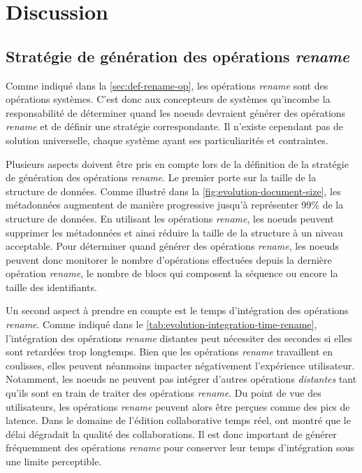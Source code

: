 \documentclass[12pt]{thesul}
\begin{document}
\section{Discussion}


\subsection{Stratégie de génération des opérations \emph{rename}}

Comme indiqué dans la \autoref{sec:def-rename-op}, les opérations \emph{rename} sont des opérations systèmes.
C'est donc aux concepteurs de systèmes qu'incombe la responsabilité de déterminer quand les noeuds devraient générer des opérations \emph{rename} et de définir une stratégie correspondante.
Il n'existe cependant pas de solution universelle, chaque système ayant ses particuliarités et contraintes.

Plusieurs aspects doivent être pris en compte lors de la définition de la stratégie de génération des opérations \emph{rename}.
Le premier porte sur la taille de la structure de données.
Comme illustré dans la \autoref{fig:evolution-document-size}, les métadonnées augmentent de manière progressive jusqu'à représenter 99\% de la structure de données.
En utilisant les opérations \emph{rename}, les noeuds peuvent supprimer les métadonnées et ainsi réduire la taille de la structure à un niveau acceptable.
Pour déterminer quand générer des opérations \emph{rename}, les noeuds peuvent donc monitorer le nombre d'opérations effectuées depuis la dernière opération \emph{rename}, le nombre de blocs qui composent la séquence ou encore la taille des identifiants.

Un second aspect à prendre en compte est le temps d'intégration des opérations \emph{rename}.
Comme indiqué dans le \autoref{tab:evolution-integration-time-rename}, l'intégration des opérations \emph{rename} distantes peut nécessiter des secondes si elles sont retardées trop longtemps.
Bien que les opérations \emph{rename} travaillent en coulisses, elles peuvent néanmoins impacter négativement l'expérience utilisateur.
Notamment, les noeuds ne peuvent pas intégrer d'autres opérations \emph{distantes} tant qu'ils sont en train de traiter des opérations \emph{rename}.
Du point de vue des utilisateurs, les opérations \emph{rename} peuvent alors être perçues comme des pics de latence.
Dans le domaine de l'édition collaborative temps réel, \textcite{2014-effect-delay-collaborative-editing-ignat,2015-cope-delay-collaborative-note-taking-ignat} ont montré que le délai dégradait la qualité des collaborations.
Il est donc important de générer fréquemment des opérations \emph{rename} pour conserver leur temps d'intégration sous une limite perceptible.
\end{document}
